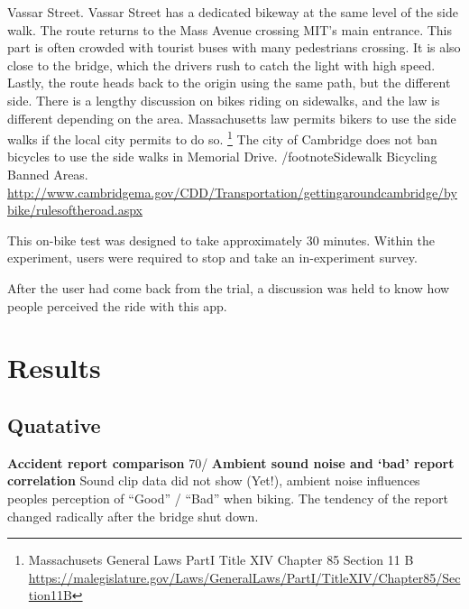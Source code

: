 Vassar Street. Vassar Street has a dedicated bikeway at the same level of
the side walk. The route returns to the Mass Avenue crossing MIT's main
entrance. This part is often crowded with tourist buses with many
pedestrians crossing. It is also close to the bridge, which the drivers
rush to catch the light with high speed. Lastly, the route heads back to
the origin using the same path, but the different side.
There is a lengthy discussion on bikes riding on sidewalks, and the law is
different depending on the area. Massachusetts law permits bikers to use
the side walks if the local city permits to do so. 
\footnote{Massachusets General Laws PartI Title XIV Chapter 85 Section 11 B
\url{https://malegislature.gov/Laws/GeneralLaws/PartI/TitleXIV/Chapter85/Section11B}}
The city of Cambridge does not ban bicycles to use the side walks in
Memorial Drive. /footnote{Sidewalk Bicycling Banned Areas.
\url{http://www.cambridgema.gov/CDD/Transportation/gettingaroundcambridge/bybike/rulesoftheroad.aspx}}

This on-bike test was designed to take approximately 30 minutes. Within the
experiment, users were required to stop and take an in-experiment survey.

After the user had come back from the trial, a discussion was held to know
how people perceived the ride with this app.

% 
\section{Results}
\subsection{Quatative}
\textbf{Accident report comparison}
70/%
\textbf{Ambient sound noise and `bad' report correlation}
Sound clip data did not show (Yet!), ambient noise influences
    peoples perception of ``Good'' / ``Bad'' when biking.
The tendency of the report changed radically after the bridge shut down.

